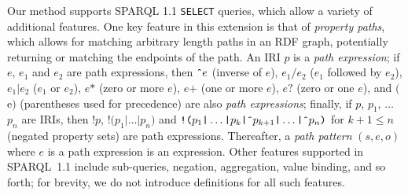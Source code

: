 \documentclass[runningheads]{llncs}
\begin{document}
Our method supports SPARQL 1.1 \texttt{SELECT} queries, which allow a variety of additional features. One key feature in this extension is that of \textit{property paths}, which allows for matching arbitrary length paths in an RDF graph, potentially returning or matching the endpoints of the path. An IRI $p$ is a \emph{path expression}; if $e$, $e_1$ and $e_2$ are path expressions, then $\texttt{\^{}}e$ (inverse of $e$), $e_1 \texttt{/} e_2$ ($e_1$ followed by $e_2$), $e_1 \texttt{|} e_2$ ($e_1$ or $e_2$), $e\texttt{*}$ (zero or more $e$), $e\texttt{+}$ (one or more $e$), $e\texttt{?}$ (zero or one $e$), and $\texttt{(}$e$\texttt{)}$ (parentheses used for precedence) are also \textit{path expressions}; finally, if $p$, $p_1$, $\ldots$ $p_n$ are IRIs, then $\texttt{!}p$, $\texttt{!}\texttt{(}p_1 \texttt{|} \ldots \texttt{|} p_n\texttt{)}$ and $\texttt{!}\texttt{(}p_1 \texttt{|} \ldots \texttt{|} p_k \texttt{|}  \texttt{{\^{}}}p_{k+1} \texttt{|} \ldots \texttt{|} \texttt{{\^{}}}p_n\texttt{)}$ for $k+1 \leq n$ (negated property sets) are path expressions. Thereafter, a \textit{path pattern} $(s,e,o)$ where $e$ is a path expression is an expression. Other features supported in SPARQL~1.1 include sub-queries, negation, aggregation, value binding, and so forth; for brevity, we do not introduce definitions for all such features.


%		
%		
%		
%		
%		
%		
%		
%		
%		
%
%	
%	
%	
\end{document}
